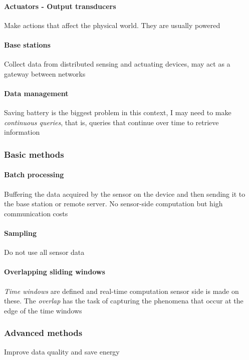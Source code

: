 \paragraph{Actuators - Output transducers}
Make actions that affect the physical world. They are usually powered

\paragraph{Base stations}
Collect data from distributed sensing and actuating devices, may act as a gateway between networks

\paragraph{Data management}
Saving battery is the biggest problem in this context, I may need to make \textit{continuous queries}, that is, queries that continue over time to retrieve information

\subsubsection{Basic methods}
\paragraph{Batch processing}
Buffering the data acquired by the sensor on the device and then sending it to the base station or remote server. No sensor-side computation but high communication costs

\paragraph{Sampling}
Do not use all sensor data

\paragraph{Overlapping sliding windows}
\textit{Time windows} are defined and real-time computation sensor side is made on these. The \textit{overlap} has the task of capturing the phenomena that occur at the edge of the time windows

\subsubsection{Advanced methods}
Improve data quality and save energy


